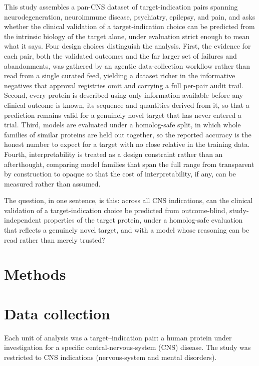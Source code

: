 \documentclass[11pt,twocolumn]{article}
\begin{document}
This study assembles a pan-CNS dataset of target-indication pairs spanning neurodegeneration, neuroimmune disease, psychiatry, epilepsy, and pain, and asks whether the clinical validation of a target-indication choice can be predicted from the intrinsic biology of the target alone, under evaluation strict enough to mean what it says. Four design choices distinguish the analysis. First, the evidence for each pair, both the validated outcomes and the far larger set of failures and abandonments, was gathered by an agentic data-collection workflow rather than read from a single curated feed, yielding a dataset richer in the informative negatives that approval registries omit and carrying a full per-pair audit trail. Second, every protein is described using only information available before any clinical outcome is known, its sequence and quantities derived from it, so that a prediction remains valid for a genuinely novel target that has never entered a trial. Third, models are evaluated under a homolog-safe split, in which whole families of similar proteins are held out together, so the reported accuracy is the honest number to expect for a target with no close relative in the training data. Fourth, interpretability is treated as a design constraint rather than an afterthought, comparing model families that span the full range from transparent by construction to opaque so that the cost of interpretability, if any, can be measured rather than assumed.

The question, in one sentence, is this: across all CNS indications, can the clinical validation of a target-indication choice be predicted from outcome-blind, study-independent properties of the target protein, under a homolog-safe evaluation that reflects a genuinely novel target, and with a model whose reasoning can be read rather than merely trusted?

\section{Methods}

\section{Data collection}

Each unit of analysis was a target--indication pair: a human protein under investigation for a specific central-nervous-system (CNS) disease. The study was restricted to CNS indications (nervous-system and mental disorders).
\end{document}
